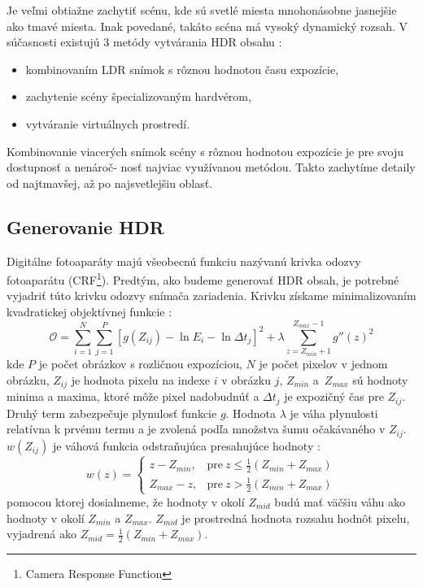 \documentclass[slovak]{ExcelAtFIT}
\begin{document}
Je veľmi obtiažne zachytiť scénu, kde sú svetlé miesta mnohonásobne jasnejšie ako tmavé miesta. Inak povedané, takáto scéna má vysoký
dynamický rozsah.
V súčasnosti existujú 3 metódy vytvárania HDR obsahu \cite{ZakladyHDR}:
\begin{itemize}
    \item kombinovaním LDR snímok s rôznou hodnotou času expozície,
    \item zachytenie scény špecializovaným hardvérom,
		\item vytváranie virtuálnych prostredí.
\end{itemize}

Kombinovanie viacerých snímok scény s rôznou hodnotou expozície je pre svoju dostupnosť a nenároč- nosť najviac využívanou metódou.
Takto zachytíme detaily od najtmavšej, až po najsvetlejšiu oblasť.

\subsection{Generovanie HDR}
\label{sec:Theory-Generate}

Digitálne fotoaparáty majú všeobecnú funkciu nazývanú krivka odozvy fotoaparátu (CRF\footnote{Camera Response Function}).
Predtým, ako budeme generovať HDR obsah, je potrebné vyjadriť túto krivku odozvy snímača zariadenia.
Krivku získame minimalizovaním kvadratickej objektívnej funkcie \cite{Debevec}:
\begin{equation}
	\mathcal{O} = 
	\sum_{i=1}^{N}
	\sum_{j=1}^{P}
	[g(Z_{ij}) - \ln E_{i} - \ln \Delta t_{j}]^{2}
	+ \lambda
	\sum_{z=Z_{min} + 1}^{Z_{max} - 1}
	g''(z)^{2}
\end{equation}
kde $P$ je počet obrázkov s rozličnou expozíciou, $N$ je počet pixelov v jednom obrázku, $Z_{ij}$ je hodnota pixelu na indexe $i$ v obrázku $j$,
$Z_{min}$ a~$Z_{max}$ sú hodnoty minima a maxima, ktoré môže pixel nadobudnúť a $\Delta t_{j}$ je expozičný čas pre $Z_{ij}$.
Druhý term zabezpečuje plynulosť funkcie $g$. Hodnota $\lambda$ je váha plynulosti relatívna 
k prvému termu a je zvolená podľa množstva šumu očakávaného v $Z_{ij}$.
$w(Z_{ij})$ je váhová funkcia odstraňujúca presahujúce hodnoty \cite{Debevec}:
\begin{equation}
  w(z)=
  \begin{cases}
    z - Z_{min}, & \text{pre}\ z \leq \frac{1}{2}(Z_{min} + Z_{max}) \\
    Z_{max} - z, & \text{pre}\ z > \frac{1}{2}(Z_{min} + Z_{max})
  \end{cases}
\end{equation}
pomocou ktorej dosiahneme, že hodnoty v okolí $Z_{mid}$ budú mať väčšiu váhu ako hodnoty v okolí $Z_{min}$ a $Z_{max}$. $Z_{mid}$ je prostredná
hodnota rozsahu hodnôt pixelu, vyjadrená ako $Z_{mid} = \frac{1}{2}(Z_{min} + Z_{max})$.
\end{document}

